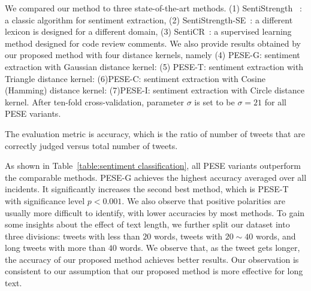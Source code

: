 \documentclass[runningheads]{llncs}
\begin{document}
We compared our method to three state-of-the-art methods. (1) SentiStrength ~\cite{sentistrength2010}: a classic algorithm for sentiment extraction, (2) SentiStrength-SE~\cite{Rakibul2017SentiStrength-SE}: a different lexicon is designed for a different domain, (3) SentiCR~\cite{Ahmed2017SentiCR}:  a supervised learning method designed for code review comments. 
We also provide results obtained by our proposed method with four distance kernels, namely (4) PESE-G: sentiment extraction with Gaussian distance kernel: (5) PESE-T: sentiment extraction with Triangle distance kernel: (6)PESE-C: sentiment extraction with Cosine (Hamming) distance kernel: (7)PESE-I: sentiment extraction with Circle distance kernel. After ten-fold cross-validation, parameter $\sigma$ is set to be $\sigma=21$ for all PESE variants.

The evaluation metric is accuracy, which is the ratio of number of tweets that are correctly judged versus total number of tweets.

As shown in Table~\ref{table:sentiment classification}, all PESE variants outperform the comparable methods.
PESE-G achieves the highest accuracy averaged over all incidents. It significantly increases the second best method, which is PESE-T with significance level $p<0.001$.
We also observe that positive polarities are usually more difficult to identify, with lower accuracies by most methods. 
To gain some insights about the effect of text length, we further split our dataset into three divisions: tweets with less than $20$ words, tweets with $20\sim 40$ words, and long tweets with more than $40$ words.
We observe that, as the tweet gets longer, the accuracy of our proposed method achieves better results. Our observation is consistent to our assumption that our proposed method is more effective for long text.
\end{document}
